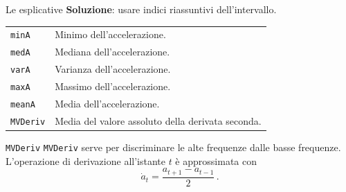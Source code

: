 \documentclass{beamer}
\begin{document}
\begin{frame}{Le esplicative}
\textbf{Soluzione}: usare indici riassuntivi dell'intervallo.
\begin{table}[H]
	\centering
	\begin{tabular}{ll}
		\texttt{minA}& Minimo dell'accelerazione.\\
		\texttt{medA}& Mediana dell'accelerazione.\\
		\texttt{varA}& Varianza dell'accelerazione.\\
		\texttt{maxA}& Massimo dell'accelerazione.\\
		\texttt{meanA}& Media dell'accelerazione.\\
		\texttt{MVDeriv}& Media del valore assoluto della derivata seconda.
	\end{tabular}
\end{table}
\end{frame}

\begin{frame}{\texttt{MVDeriv}}
\texttt{MVDeriv} serve per discriminare le alte frequenze dalle basse frequenze.\\
\bigskip
L'operazione di derivazione all'istante $t$ è approssimata con\cite{NumpyGradientNumPy}
\[
\dot{a}_t = \dfrac{a_{t + 1} - a_{t - 1}}{2}\,.
\]
\end{frame}
\end{document}
